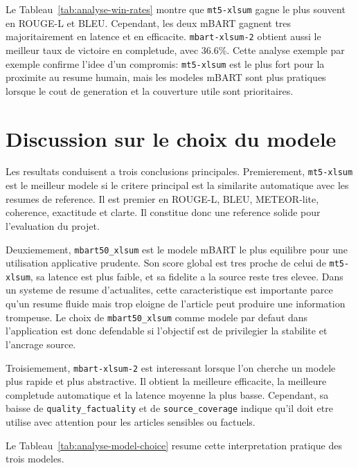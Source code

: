 Le Tableau~\ref{tab:analyse-win-rates} montre que \texttt{mt5-\allowbreak xlsum} gagne le plus souvent en ROUGE-L et BLEU. Cependant, les deux mBART gagnent tres majoritairement en latence et en efficacite. \texttt{mbart-\allowbreak xlsum-2} obtient aussi le meilleur taux de victoire en completude, avec 36.6\%. Cette analyse exemple par exemple confirme l'idee d'un compromis: \texttt{mt5-\allowbreak xlsum} est le plus fort pour la proximite au resume humain, mais les modeles mBART sont plus pratiques lorsque le cout de generation et la couverture utile sont prioritaires.

\section{Discussion sur le choix du modele}

Les resultats conduisent a trois conclusions principales. Premierement, \texttt{mt5-\allowbreak xlsum} est le meilleur modele si le critere principal est la similarite automatique avec les resumes de reference. Il est premier en ROUGE-L, BLEU, METEOR-lite, coherence, exactitude et clarte. Il constitue donc une reference solide pour l'evaluation du projet.

Deuxiemement, \texttt{mbart50\_\allowbreak xlsum} est le modele mBART le plus equilibre pour une utilisation applicative prudente. Son score global est tres proche de celui de \texttt{mt5-\allowbreak xlsum}, sa latence est plus faible, et sa fidelite a la source reste tres elevee. Dans un systeme de resume d'actualites, cette caracteristique est importante parce qu'un resume fluide mais trop eloigne de l'article peut produire une information trompeuse. Le choix de \texttt{mbart50\_\allowbreak xlsum} comme modele par defaut dans l'application est donc defendable si l'objectif est de privilegier la stabilite et l'ancrage source.

Troisiemement, \texttt{mbart-\allowbreak xlsum-2} est interessant lorsque l'on cherche un modele plus rapide et plus abstractive. Il obtient la meilleure efficacite, la meilleure completude automatique et la latence moyenne la plus basse. Cependant, sa baisse de \texttt{quality\_\allowbreak factuality} et de \texttt{source\_\allowbreak coverage} indique qu'il doit etre utilise avec attention pour les articles sensibles ou factuels.

Le Tableau~\ref{tab:analyse-model-choice} resume cette interpretation pratique des trois modeles.

